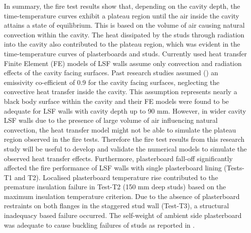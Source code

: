 In summary, the fire test results show that, depending on the cavity depth, the time-temperature curves exhibit a plateau region until the air inside the cavity attains a state of equilibrium. This is based on the volume of air causing natural convection within the cavity. The heat dissipated by the studs through radiation into the cavity also contributed to the plateau region, which was evident in the time-temperature curves of plasterboards and studs. Currently used heat transfer Finite Element (FE) models of LSF walls assume only convection and radiation effects of the cavity facing surfaces. Past research studies assumed (\citet{Feng2003,Keerthan2012a,Gunalan2013f,Rusthi2017}) an emissivity co-efficient of 0.9 for the cavity facing surfaces, neglecting the convective heat transfer inside the cavity. This assumption represents nearly a black body surface within the cavity and their FE models were found to be adequate for LSF walls with cavity depth up to 90 mm. However, in wider cavity LSF walls due to the presence of large volume of air influencing natural convection, the heat transfer model might not be able to simulate the plateau region observed in the fire tests. Therefore the fire test results from this research study will be useful to develop and validate the numerical models to simulate the observed heat transfer effects. Furthermore, plasterboard fall-off significantly affected the fire performance of LSF walls with single plasterboard lining (Tests-T1 and T2). Localised plasterboard temperature rise contributed to the premature insulation failure in Test-T2 (150 mm deep studs) based on the maximum insulation temperature criterion. Due to the absence of plasterboard restraints on both flanges in the staggered stud wall (Test-T3), a structural inadequacy based failure occurred. The self-weight of ambient side plasterboard was adequate to cause buckling failures of studs as reported in \citet{Dias2018}.




